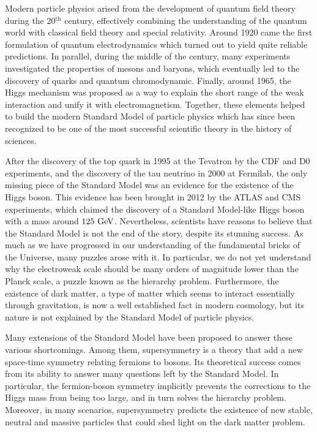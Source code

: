Modern particle physics arised from the development of quantum field theory during
the 20$^\text{th}$ century, effectively combining the understanding of the
quantum world with classical field theory and special relativity. Around 1920 came the first
formulation of quantum electrodynamics which turned out to yield quite reliable predictions.
In parallel, during the middle of the century, many experiments investigated the properties
of mesons and baryons, which eventually led to the discovery of quarks and quantum chromodynamic.
Finally, around 1965, the Higgs mechanism was proposed as a way to explain the short range
of the weak interaction and unify it with electromagnetism. Together, these elements helped
to build the modern Standard Model of particle physics which has since been recognized to be
one of the most successful scientific theory in the history of sciences.

After the discovery of the top quark in 1995 at the Tevatron by the CDF and D0 experiments,
and the discovery of the tau neutrino in 2000 at Fermilab,
the only missing piece of the Standard Model was an evidence for the existence of the Higgs
boson. This evidence has been brought in 2012 by the ATLAS and CMS experiments,
which claimed the discovery of a Standard Model-like Higgs boson with a mass around
$125~\text{GeV}$. Nevertheless, scientists have reasons to believe that the Standard Model is not
the end of the story, despite its stunning success. As much as we have progressed in our
understanding of the fundamental bricks of the Universe, many puzzles arose with it. In
particular, we do not yet understand why the electroweak scale should be many orders of
magnitude lower than the Planck scale, a puzzle known as the hierarchy
problem. Furthermore, the existence of dark matter, a type of matter which seems to interact
essentially through gravitation, is now a well established fact in modern cosmology, but
its nature is not explained by the Standard Model of particle physics.

Many extensions of the Standard Model have been proposed to answer these various shortcomings.
Among them, supersymmetry is a theory that add a new space-time symmetry relating fermions
to bosons. Its theoretical success comes from its ability to answer many questions left by the
Standard Model. In particular, the fermion-boson symmetry implicitly prevents the corrections
to the Higgs mass from being too large, and in turn solves the hierarchy problem.
Moreover, in many scenarios, supersymmetry predicts the existence of new stable, neutral
and massive particles that could shed light on the dark matter problem.

